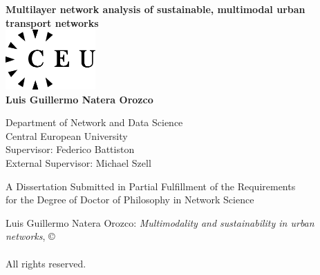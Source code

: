 \documentclass[a4paper,twoside,12pt]{book}
\begin{document}
\begin{titlepage}
	\begin{center}

		\textbf{\LARGE{Multilayer network analysis of sustainable, multimodal urban transport networks}}\\[3.3cm] %

		\includegraphics[width=3.45cm,height=2.3cm]{images/ceulogo.eps}\\[3.4cm]
		{\Large{\textbf{Luis Guillermo Natera Orozco}}}\\[0.4cm]

		\medskip

		Department of Network and Data Science \\
		Central European University\\ [1.2cm]

		Supervisor: Federico Battiston \\
		External Supervisor: Michael Szell

		\vfill

		A Dissertation Submitted in Partial Fulfillment of the Requirements\\ for the Degree of Doctor of Philosophy in Network Science\\[2cm]


		\vspace{1.0cm}
		\the\year
	\end{center}
\end{titlepage}

\newpage

\pagestyle{empty}

\mbox{}

\vfill

\noindent Luis Guillermo Natera Orozco: \emph{Multimodality and sustainability in urban networks}, \copyright \\
\the\year \\ All rights reserved.



\mbox{}
\end{document}
